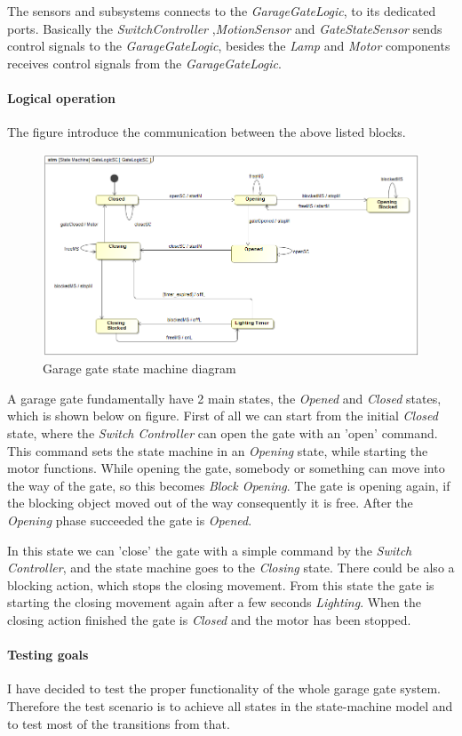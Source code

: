 The sensors and subsystems connects to the \textit{GarageGateLogic}, to its dedicated ports. Basically the \textit{SwitchController} ,\textit{MotionSensor} and \textit{GateStateSensor} sends control signals to the \textit{GarageGateLogic}, besides the \textit{Lamp} and \textit{Motor} components receives control signals from the \textit{GarageGateLogic}.

\paragraph{Logical operation}

The  figure introduce the communication between the above listed blocks.

\begin{figure}[!ht]
	\centering
	\includegraphics[width=150mm, keepaspectratio]{figures/magicDraw/GateLogicSC.png}
	\caption{Garage gate state machine diagram}
	\label{fig:Garage Statemachine}
\end{figure}

A garage gate fundamentally have 2 main states, the \textit{Opened} and \textit{Closed} states, which is shown below on  figure. First of all we can start from the initial \textit{Closed} state, where the \textit{Switch Controller} can open the gate with an 'open' command. This command sets the state machine in an \textit{Opening} state, while starting the motor functions. While opening the gate, somebody or something can move into the way of the gate, so this becomes \textit{Block Opening}. The gate is opening again, if the blocking object moved out of the way consequently it is free. After the \textit{Opening} phase succeeded the gate is \textit{Opened}. 

In this state we can 'close' the gate with a simple command by the \textit{Switch Controller}, and the state machine goes to the \textit{Closing} state. There could be also a blocking action, which stops the closing movement. From this state the gate is starting the closing movement again after a few seconds \textit{Lighting}. When the closing action finished the gate is \textit{Closed} and the motor has been stopped.


\paragraph{Testing goals}
I have decided to test the proper functionality of the whole garage gate system. Therefore the test scenario is to achieve all states in the state-machine model and to test most of the transitions from that.

